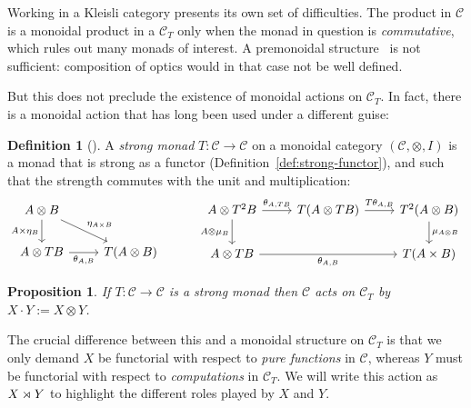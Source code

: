 \documentclass[11pt,letterpaper]{article}
\theoremstyle{plain}
\newtheorem{proposition}[theorem]{Proposition}
\theoremstyle{definition}
\newtheorem{definition}[theorem]{Definition}
\newcommand{\C}{\mathscr{C}}
\newcommand{\act}{\cdot}
\begin{document}
Working in a Kleisli category presents its own set of difficulties. The product in $\C$ is a monoidal product in a $\C_T$ only when the monad in question is \emph{commutative}, which rules out many monads of interest. A premonoidal structure~\cite{PremonoidalCategories} is not sufficient: composition of optics would in that case not be well defined.

But this does not preclude the existence of monoidal actions on $\C_T$. In fact, there is a monoidal action that has long been used under a different guise:

\begin{definition}[{\cite{NotionsOfComputationAndMonads}}]
A \emph{strong monad} $T : \C \to \C$ on a monoidal category $(\C, \otimes, I)$ is a monad that is strong as a functor (Definition~\ref{def:strong-functor}), and such that the strength commutes with the unit and multiplication:
\[
  \begin{tikzcd}
    A \otimes B \ar[d, swap, "A \times \eta_B"] \ar[dr, "\eta_{A \times B}"] & \\
    A \otimes TB \ar[r, swap, "\theta_{A, B}"] & T(A \otimes B)
  \end{tikzcd} \hspace{1cm}
  \begin{tikzcd}
    A \otimes T^2 B \ar[r, "\theta_{A, TB}"] \ar[d, swap, "A \otimes \mu_B"] & T(A \otimes TB) \ar[r, "T\theta_{A, B}"] & T^2(A \otimes B) \ar[d, "\mu_{A \otimes B}"] \\
    A \otimes TB \ar[rr, swap, "\theta_{A, B}"] & & T(A \times B)
  \end{tikzcd}
\]
\end{definition}

\begin{proposition}
If $T : \C \to \C$ is a strong monad then $\C$ acts on $\C_T$ by $X \act Y := X \otimes Y$.
\end{proposition}

The crucial difference between this and a monoidal structure on $\C_T$ is that we only demand $X$ be functorial with respect to \emph{pure functions} in $\C$, whereas $Y$ must be functorial with respect to \emph{computations} in $\C_T$. We will write this action as $X \rtimes Y$ to highlight the different roles played by $X$ and $Y$.
\end{document}
